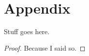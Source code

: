 
\section{Appendix}

\begin{claim}
	Stuff goes here.
	\label{clm:example}
\end{claim}

\begin{proof}
	Because I said so.
\end{proof}
